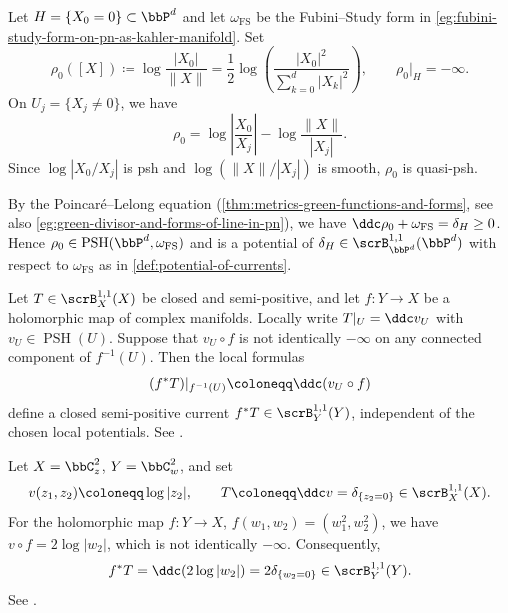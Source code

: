 \begin{example}[label=\labelNFM{eg:green-function-of-lines-is-psh}, status=draft, tag=0000000]
	Let $H = \{X_0 = 0\} \subset \bbP^d$ and let $\omega_{\mathrm{FS}}$ be the Fubini--Study form in \cref{eg:fubini-study-form-on-pn-as-kahler-manifold}.
	Set
	\[ \rho_0([X]) \coloneqq \log\frac{|X_0|}{\|X\|} = \frac{1}{2} \log\left(\frac{|X_0|^2}{\sum_{k = 0}^d |X_k|^2}\right), \qquad \rho_0|_H = -\infty. \]
	On $U_j = \{X_j \neq 0\}$, we have
	\[ \rho_0 = \log\left|\frac{X_0}{X_j}\right| - \log\frac{\|X\|}{|X_j|}. \]
	Since $\log|X_0/X_j|$ is psh and $\log(\|X\|/|X_j|)$ is smooth,
	$\rho_0$ is quasi-psh.

  By the Poincar\'e--Lelong equation (\cref{thm:metrics-green-functions-and-forms}, see also \cref{eg:green-divisor-and-forms-of-line-in-pn}), we have $\ddc \rho_0 + \omega_{\mathrm{FS}} = \delta_H \geq 0$.
  Hence $\rho_0 \in \operatorname{PSH}(\bbP^d,\omega_{\mathrm{FS}})$ and is a potential of $\delta_H \in \scrB_{\bbP^d}^{1,1}(\bbP^d)$ with respect to $\omega_{\mathrm{FS}}$ as in \cref{def:potential-of-currents}.
\end{example}

\begin{construction}[label=\labelNFM{prop:pull-back-of-semipositive-11-current}, status=draft, tag=0000000]
	Let $T \in \scrB_X^{1,1}(X)$ be closed and semi-positive,
	and let $f:Y \to X$ be a holomorphic map of complex manifolds.
	Locally write $T|_U = \ddc v_U$ with $v_U \in \operatorname{PSH}(U)$.
	Suppose that $v_U \circ f$ is not identically $-\infty$ on any connected component of $f^{-1}(U)$.
	Then the local formulas
	\[ (f^*T)|_{f^{-1}(U)} \coloneqq \ddc(v_U \circ f) \]
	define a closed semi-positive current $f^*T \in \scrB_Y^{1,1}(Y)$, independent of the chosen local potentials.
  See \cite[Chapter~III, Proposition~1.19, and Chapter~I, Theorem~5.11]{Demailly-2012-ComplexAnalyticDifferential}.
\end{construction}

\begin{example}[label=\labelNFM{eg:pull-back-of-semipositive-11-currents}, status=draft, tag=0000000]
	Let $X = \bbC_z^2$, $Y = \bbC_w^2$, and set
	\[ v(z_1,z_2) \coloneqq \log|z_2|, \qquad T \coloneqq \ddc v = \delta_{\{z_2 = 0\}} \in \scrB_X^{1,1}(X). \]
	For the holomorphic map $f:Y \to X$, $f(w_1,w_2) = (w_1^2,w_2^2)$,
	we have $v \circ f = 2 \log|w_2|$, which is not identically $-\infty$.
	Consequently,
	\[ f^*T = \ddc(2 \log|w_2|) = 2 \delta_{\{w_2 = 0\}} \in \scrB_Y^{1,1}(Y). \]
	See \cite[Theorem~6.3.1 and Exercise~6.3.5]{Dinh-Sibony-2005-IntroductionTheoryCurrents}.
\end{example}

